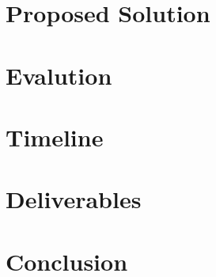 \documentclass[10pt]{article}
\begin{document}
\begin{multicols}{2}
  \section{Proposed Solution}
  \section{Evalution}
  \section{Timeline}
  \section{Deliverables}
  \section{Conclusion}
\end{multicols}
\end{document}
